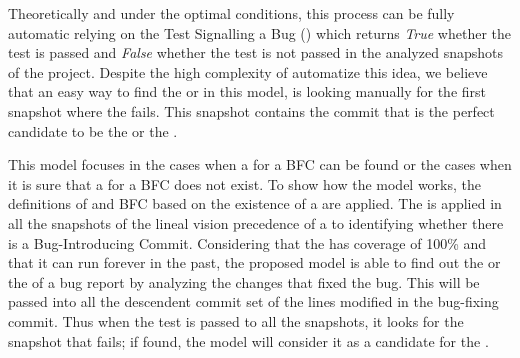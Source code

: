 \documentclass[a4paper, 12pt]{book}
\begin{document}
Theoretically and under the optimal conditions, this process can be fully automatic relying on the Test Signalling a Bug (\TSB) which returns \emph{True} whether the test is passed and \emph{False} whether the test is not passed in the analyzed snapshots of the project. Despite the high complexity of automatize this idea, we believe that an easy way to find the \BIC or \FFC in this model, is looking manually for the first snapshot where the \TSB fails. This snapshot contains the commit that is the perfect candidate to be the \BIC or the \FFC.

This model focuses in the cases when a \BIC for a BFC can be found or the cases when it is sure that a \BIC for a BFC does not exist. To show how the model works, the definitions of \BIC and BFC based on the existence of a \TSB are applied. The \TSB is applied in all the snapshots of the lineal vision precedence of a \BFC to identifying whether there is a Bug-Introducing Commit. Considering that the \TSB  has coverage of 100\% and that it can run forever in the past, the proposed model is able to find out the \BIC or the \FFC of a bug report by analyzing the changes that fixed the bug. This \TSB will be passed into all the descendent commit set of the lines modified in the bug-fixing commit. Thus when the \TSB test is passed to all the snapshots, it looks for the snapshot that fails; if found, the model will consider it as a candidate for the \BIC. %


\end{document}
